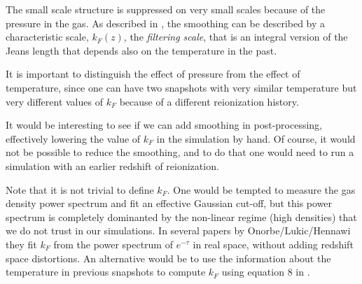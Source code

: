 The small scale structure is suppressed on very small scales because of the
pressure in the gas.
As described in \cite{Hui1997,Gnedin1998}, the smoothing can be described
by a characteristic scale, $k_F(z)$, the \textit{filtering scale}, that is
an integral version of the Jeans length that depends also on the temperature
in the past.

It is important to distinguish the effect of pressure from the effect of
temperature, since one can have two snapshots with very similar temperature
but very different values of $k_F$ because of a different reionization
history.


It would be interesting to see if we can add smoothing in post-processing,
effectively lowering the value of $k_F$ in the simulation by hand.
Of course, it would not be possible to reduce the smoothing, and to do that
one would need to run a simulation with an earlier redshift of reionization.

Note that it is not trivial to define $k_F$.
One would be tempted to measure the gas density power spectrum and fit an
effective Gaussian cut-off, but this power spectrum is completely dominanted
by the non-linear regime (high densities) that we do not trust in our 
simulations.
In several papers by Onorbe/Lukic/Hennawi 
\cite{Lukic2015,Onorbe2016,Walther2018a,Walther2018b} they fit $k_F$ from
the power spectrum of $e^{-\tau}$ in real space, without adding redshift
space distortions.
An alternative would be to use the information about the temperature in
previous snapshots to compute $k_F$ using equation $8$ in \cite{Gnedin1998}.



